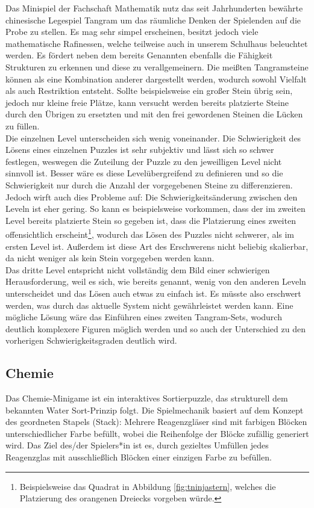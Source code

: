 Das Minispiel der Fachschaft Mathematik nutz das seit Jahrhunderten bewährte chinesische Legespiel \glqq Tangram\grqq{} um das räumliche Denken der Spielenden auf die Probe zu stellen.
Es mag sehr simpel erscheinen, besitzt jedoch viele mathematische Rafinessen, welche teilweise auch in unserem Schulhaus beleuchtet werden. 
Es fördert neben dem bereits Genannten ebenfalls die Fähigkeit Strukturen zu erkennen und diese zu verallgemeinern.
Die meißten Tangramsteine können als eine Kombination anderer dargestellt werden, wodurch sowohl Vielfalt als auch Restriktion entsteht.
Sollte beispielsweise ein großer Stein übrig sein, jedoch nur kleine freie Plätze, kann versucht werden bereits platzierte Steine durch den Übrigen zu ersetzten und mit den frei gewordenen Steinen die Lücken zu füllen.\\
Die einzelnen Level unterscheiden sich wenig voneinander.
Die Schwierigkeit des Lösens eines einzelnen Puzzles ist sehr subjektiv und lässt sich so schwer festlegen, weswegen die Zuteilung der Puzzle zu den jeweilligen Level nicht sinnvoll ist.
Besser wäre es diese Levelübergreifend zu definieren und so die Schwierigkeit nur durch die Anzahl der vorgegebenen Steine zu differenzieren.
Jedoch wirft auch dies Probleme auf:
Die Schwierigkeitsänderung zwischen den Leveln ist eher gering.
So kann es beispielsweise vorkommen, dass der im zweiten Level bereits platzierte Stein so gegeben ist, dass die Platzierung eines zweiten offensichtlich erscheint\footnote{Beispielsweise das Quadrat in Abbildung \ref{fig:tninjastern}, welches die Platzierung des orangenen Dreiecks vorgeben würde.}, wodurch das Lösen des Puzzles nicht schwerer, als im ersten Level ist.
Außerdem ist diese Art des Erschwerens nicht beliebig skalierbar, da nicht weniger als kein Stein vorgegeben werden kann.\\
Das dritte Level entspricht nicht vollständig dem Bild einer schwierigen Herausforderung, weil es sich, wie bereits genannt, wenig von den anderen Leveln unterscheidet und das Lösen auch etwas zu einfach ist.
Es müsste also erschwert werden, was durch das aktuelle System nicht gewährleistet werden kann.
Eine mögliche Lösung wäre das Einführen eines zweiten Tangram-Sets, wodurch deutlich komplexere Figuren möglich werden und so auch der Unterschied zu den vorherigen Schwierigkeitsgraden deutlich wird.

\subsection{Chemie}
Das Chemie-Minigame ist ein interaktives Sortierpuzzle, das strukturell dem bekannten \glqq{}Water Sort\grqq{}-Prinzip folgt. Die Spielmechanik basiert auf dem Konzept des geordneten Stapels (Stack): Mehrere Reagenzgläser sind mit farbigen Blöcken unterschiedlicher Farbe befüllt, wobei die Reihenfolge der Blöcke zufällig generiert wird.
Das Ziel des/der Spielers*in ist es, durch gezieltes Umfüllen jedes Reagenzglas mit ausschließlich Blöcken einer einzigen Farbe zu befüllen.

